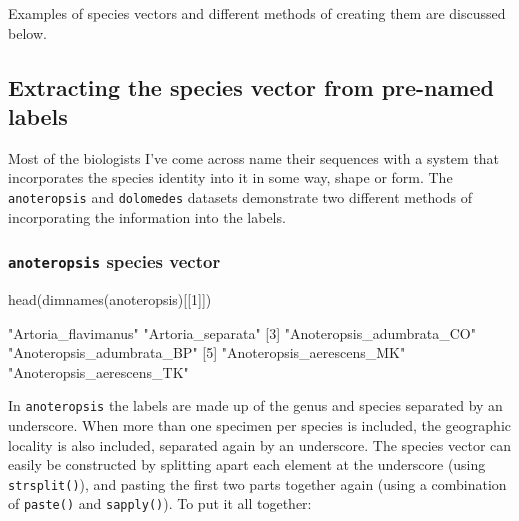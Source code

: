 \documentclass{article}
\newcommand{\fun}[1]{\texttt{#1}}
\begin{document}
Examples of species vectors and different methods of creating them are discussed below. 




\subsection{Extracting the species vector from pre-named labels}
Most of the biologists I've come across name their sequences with a  system that incorporates the species identity into it in some way, shape or form. The \fun{anoteropsis} and \fun{dolomedes} datasets demonstrate two different methods of incorporating the information into the labels.

\subsubsection{\fun{anoteropsis} species vector}

\begin{console}
head(dimnames(anoteropsis)[[1]])
\end{console}

\begin{Routput}
[1] "Artoria_flavimanus"       "Artoria_separata"        
[3] "Anoteropsis_adumbrata_CO" "Anoteropsis_adumbrata_BP"
[5] "Anoteropsis_aerescens_MK" "Anoteropsis_aerescens_TK"
\end{Routput}

In \fun{anoteropsis} the labels are made up of the genus and species separated by an underscore. When more than one specimen per species is included, the geographic locality is also included, separated again by an underscore. The species vector can easily be constructed by splitting apart each element at the underscore (using \fun{strsplit()}), and pasting the first two parts together again (using a combination of \fun{paste()} and \fun{sapply()}). To put it all together:
\end{document}
